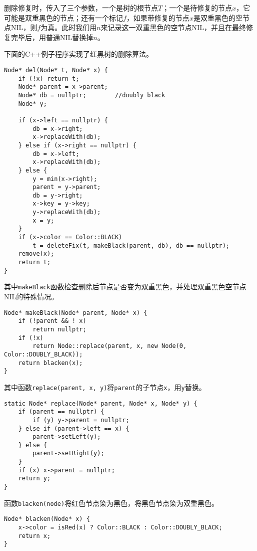 \documentclass[UTF8]{article}
\begin{document}
删除修复时，传入了三个参数，一个是树的根节点$T$；一个是待修复的节点$x$，它可能是双重黑色的节点；还有一个标记$f$，如果带修复的节点$x$是双重黑色的空节点NIL，则$f$为真。此时我们用$n$来记录这一双重黑色的空节点NIL，并且在最终修复完毕后，用普通NIL替换掉$n$。

下面的C++例子程序实现了红黑树的删除算法。

\lstset{language=C++}
\begin{lstlisting}
Node* del(Node* t, Node* x) {
    if (!x) return t;
    Node* parent = x->parent;
    Node* db = nullptr;        //doubly black
    Node* y;

    if (x->left == nullptr) {
        db = x->right;
        x->replaceWith(db);
    } else if (x->right == nullptr) {
        db = x->left;
        x->replaceWith(db);
    } else {
        y = min(x->right);
        parent = y->parent;
        db = y->right;
        x->key = y->key;
        y->replaceWith(db);
        x = y;
    }
    if (x->color == Color::BLACK)
        t = deleteFix(t, makeBlack(parent, db), db == nullptr);
    remove(x);
    return t;
}
\end{lstlisting}

其中\texttt{makeBlack}函数检查删除后节点是否变为双重黑色，并处理双重黑色空节点NIL的特殊情况。

\begin{lstlisting}
Node* makeBlack(Node* parent, Node* x) {
    if (!parent && ! x)
        return nullptr;
    if (!x)
        return Node::replace(parent, x, new Node(0, Color::DOUBLY_BLACK));
    return blacken(x);
}
\end{lstlisting}

其中函数\texttt{replace(parent, x, y)}将\texttt{parent}的子节点\texttt{x}，用\texttt{y}替换。

\begin{lstlisting}
static Node* replace(Node* parent, Node* x, Node* y) {
    if (parent == nullptr) {
        if (y) y->parent = nullptr;
    } else if (parent->left == x) {
        parent->setLeft(y);
    } else {
        parent->setRight(y);
    }
    if (x) x->parent = nullptr;
    return y;
}
\end{lstlisting}

函数\texttt{blacken(node)}将红色节点染为黑色，将黑色节点染为双重黑色。

\begin{lstlisting}
Node* blacken(Node* x) {
    x->color = isRed(x) ? Color::BLACK : Color::DOUBLY_BLACK;
    return x;
}
\end{lstlisting}
\end{document}
